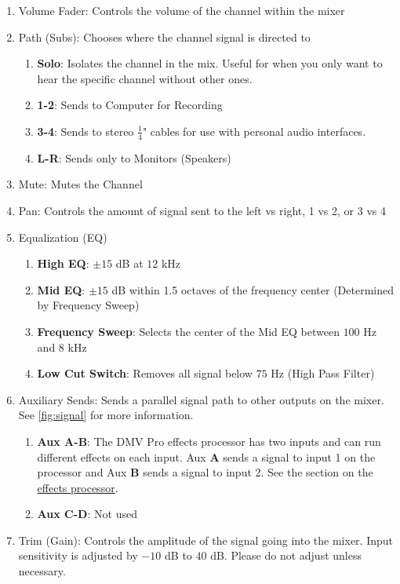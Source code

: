 \begin{multicols}{2}
\small
\begin{enumerate}
	\item Volume Fader: Controls the volume of the channel within the mixer
	\item Path (Subs): Chooses where the channel signal is directed to
	\begin{enumerate}
		\item \textbf{Solo}: Isolates the channel in the mix. Useful for when you only want to hear the specific channel without other ones.
		\item \textbf{1-2}: Sends to Computer for Recording
		\item \textbf{3-4}: Sends to stereo $\frac{1}{4}$" cables for use with personal audio interfaces.
		\item \textbf{L-R}: Sends only to Monitors (Speakers)
	\end{enumerate}
	\item Mute: Mutes the Channel
	\item Pan: Controls the amount of signal sent to the left vs right, 1 vs 2, or 3 vs 4
	\item Equalization (EQ)
	\begin{enumerate}
		\item \textbf{High EQ}: $\pm 15$ dB at $12$ kHz
		\item \textbf{Mid EQ}: $\pm 15$ dB within 1.5 octaves of the frequency center (Determined by Frequency Sweep)
		\item \textbf{Frequency Sweep}: Selects the center of the Mid EQ between $100$ Hz and $8$ kHz
		\item \textbf{Low Cut Switch}: Removes all signal below $75$ Hz (High Pass Filter)
	\end{enumerate}
	\item Auxiliary Sends: Sends a parallel signal path to other outputs on the mixer. See \ref{fig:signal} for more information.
	\begin{enumerate}
		\item \textbf{Aux A-B}: The DMV Pro effects processor has two inputs and can run different effects on each input. Aux \textbf{A} sends a signal to input 1 on the processor and Aux \textbf{B} sends a signal to input 2. See the section on the \hyperlink{effects processor}{effects processor}.
		\item \textbf{Aux C-D}: Not used
	\end{enumerate}
	\item Trim (Gain): Controls the amplitude of the signal going into the mixer. Input sensitivity is adjusted by $-10$ dB to $40$ dB. Please do not adjust unless necessary.
\end{enumerate}


\end{multicols}
